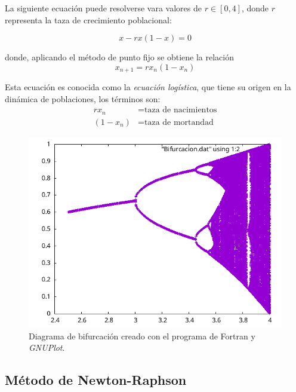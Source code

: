 \begin{ex}
    La siguiente ecuación puede resolverse vara valores de $r \in [0,4]$,
    donde $r$ representa la taza de crecimiento poblacional:

    \[
        x - rx(1 - x) = 0
    \]

    \noindent donde, aplicando el método de punto fijo se obtiene la relación
    \[
        x_{n+1} = r x_n (1 - x_n)
    \]

    Esta ecuación es conocida como la \emph{ecuación logística}, que tiene su
    origen en la dinámica de poblaciones, los términos son:
    \begin{align*}
        rx_n &= \text{taza de nacimientos} \\
        (1 - x_n) &= \text{taza de mortandad}
    \end{align*}

    

    \begin{figure}
        \centering
        \includegraphics[width=1.0\textwidth]{programas/bifurcacion/bifurcacion.png}
        \caption{Diagrama de bifurcación creado con el programa de
        Fortran y \textit{GNUPlot}.}
    \end{figure}
\end{ex}

\subsection{Método de Newton-Raphson}

